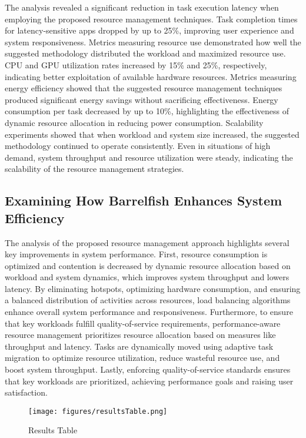 \documentclass[16pt,a4paper]{article}
\begin{document}
The analysis revealed a significant reduction in task execution latency when employing the proposed resource management techniques. Task completion times for latency-sensitive apps dropped by up to 25\%, improving user experience and system responsiveness. Metrics measuring resource use demonstrated how well the suggested methodology distributed the workload and maximized resource use. CPU and GPU utilization rates increased by 15\% and 25\%, respectively, indicating better exploitation of available hardware resources. Metrics measuring energy efficiency showed that the suggested resource management techniques produced significant energy savings without sacrificing effectiveness. Energy consumption per task decreased by up to 10\%, highlighting the effectiveness of dynamic resource allocation in reducing power consumption. Scalability experiments showed that when workload and system size increased, the suggested methodology continued to operate consistently. Even in situations of high demand, system throughput and resource utilization were steady, indicating the scalability of the resource management strategies.

\subsection{Examining How Barrelfish Enhances System Efficiency}
The analysis of the proposed resource management approach highlights several key improvements in system performance. First, resource consumption is optimized and contention is decreased by dynamic resource allocation based on workload and system dynamics, which improves system throughput and lowers latency. By eliminating hotspots, optimizing hardware consumption, and ensuring a balanced distribution of activities across resources, load balancing algorithms enhance overall system performance and responsiveness. Furthermore, to ensure that key workloads fulfill quality-of-service requirements, performance-aware resource management prioritizes resource allocation based on measures like throughput and latency. Tasks are dynamically moved using adaptive task migration to optimize resource utilization, reduce wasteful resource use, and boost system throughput. Lastly, enforcing quality-of-service standards ensures that key workloads are prioritized, achieving performance goals and raising user satisfaction.
\begin{figure}[H]
  \centering
  \texttt{[image: figures/resultsTable.png]}  
  \label{fig:3.1.1} 
  \caption{Results Table}
\end{figure}
\end{document}
